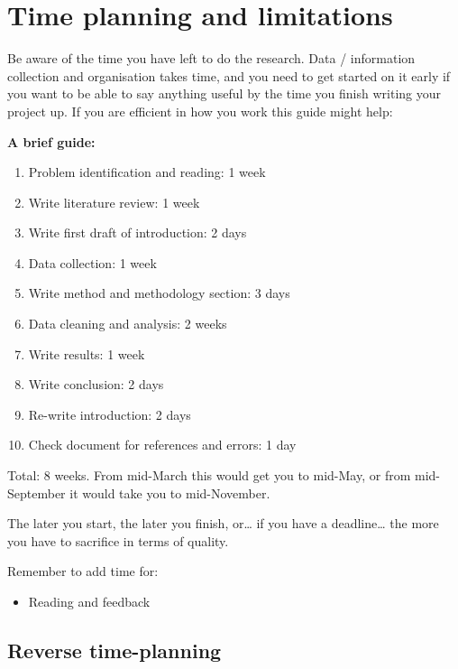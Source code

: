 \documentclass[
]{book}
\providecommand{\tightlist}{%
  \setlength{\itemsep}{0pt}\setlength{\parskip}{0pt}}
\begin{document}
\hypertarget{time-planning-and-limitations}{%
\chapter{Time planning and limitations}\label{time-planning-and-limitations}}

Be aware of the time you have left to do the research. Data /
information collection and organisation takes time, and you need to get
started on it early if you want to be able to say anything useful by the
time you finish writing your project up. If you are efficient in how you
work this guide might help:

\textbf{A brief guide:}

\begin{enumerate}
\def\labelenumi{\arabic{enumi}.}
\item
  Problem identification and reading: 1 week
\item
  Write literature review: 1 week
\item
  Write first draft of introduction: 2 days
\item
  Data collection: 1 week
\item
  Write method and methodology section: 3 days
\item
  Data cleaning and analysis: 2 weeks
\item
  Write results: 1 week
\item
  Write conclusion: 2 days
\item
  Re-write introduction: 2 days
\item
  Check document for references and errors: 1 day
\end{enumerate}

Total: 8 weeks. From mid-March this would get you to mid-May, or from
mid-September it would take you to mid-November.

The later you start, the later you finish, or\ldots{} if you have a
deadline\ldots{} the more you have to sacrifice in terms of quality.

Remember to add time for:

\begin{itemize}
\tightlist
\item
  Reading and feedback
\end{itemize}

\hypertarget{reverse-time-planning}{%
\section{Reverse time-planning}\label{reverse-time-planning}}
\end{document}
